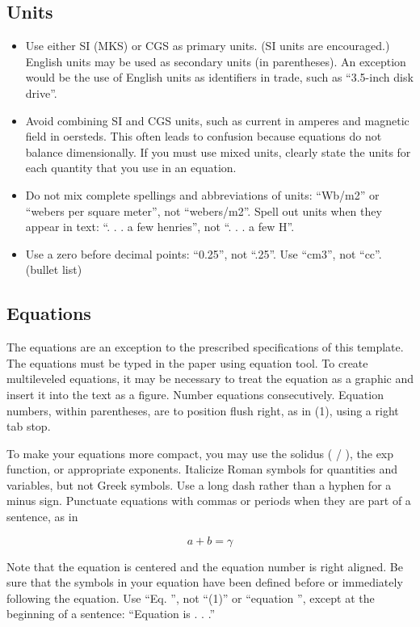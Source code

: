 \documentclass[conference, letterpaper]{IEEEtran}
\begin{document}
\subsection{Units}
\begin{itemize}
\item Use either SI (MKS) or CGS as primary units. (SI units are encouraged.) English units may be used as secondary units (in parentheses). An exception would be the use of English units as identifiers in trade, such as “3.5-inch disk drive”.
\item Avoid combining SI and CGS units, such as current in amperes and magnetic field in oersteds. This often leads to confusion because equations do not balance dimensionally. If you must use mixed units, clearly state the units for each quantity that you use in an equation.
\item Do not mix complete spellings and abbreviations of units: “Wb/m2” or “webers per square meter”, not “webers/m2”.  Spell out units when they appear in text: “. . . a few henries”, not “. . . a few H”.
\item Use a zero before decimal points: “0.25”, not “.25”. Use “cm3”, not “cc”. (bullet list)
\end{itemize}

\subsection{Equations}
The equations are an exception to the prescribed specifications of this template. The equations must be typed in the paper using equation tool. To create multileveled equations, it may be necessary to treat the equation as a graphic and insert it into the text as a figure. Number equations consecutively. Equation numbers, within parentheses, are to position flush right, as in (1), using a right tab stop. 

To make your equations more compact, you may use the solidus ( / ), the exp function, or appropriate exponents. Italicize Roman symbols for quantities and variables, but not Greek symbols. Use a long dash rather than a hyphen for a minus sign. Punctuate equations with commas or periods when they are part of a sentence, as in

\begin{equation}
a + b = \gamma
\label{eq:1}
\end{equation}

Note that the equation is centered and the equation number is right aligned. Be sure that the symbols in your equation have been defined before or immediately following the equation. Use “Eq. \label{eq:1}”, not “(1)” or “equation \label{eq:1}”, except at the beginning of a sentence: “Equation \label{eq:1} is . . .”
\end{document}
